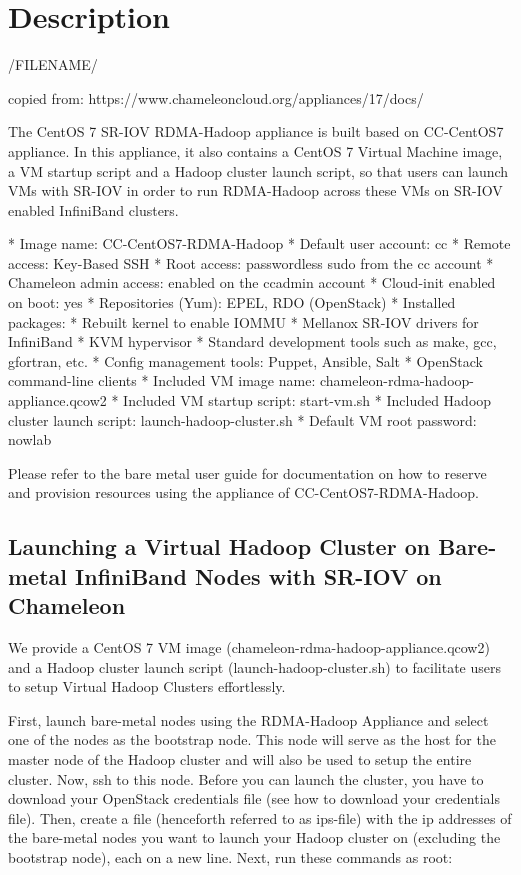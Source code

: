 \section{Description}

/FILENAME/

copied from: https://www.chameleoncloud.org/appliances/17/docs/

The CentOS 7 SR-IOV RDMA-Hadoop appliance is built based on CC-CentOS7
appliance. In this appliance, it also contains a CentOS 7 Virtual
Machine image, a VM startup script and a Hadoop cluster launch script,
so that users can launch VMs with SR-IOV in order to run RDMA-Hadoop
across these VMs on SR-IOV enabled InfiniBand clusters.

* Image name: CC-CentOS7-RDMA-Hadoop
* Default user account: cc
* Remote access: Key-Based SSH
* Root access: passwordless sudo from the cc account
* Chameleon admin access: enabled on the ccadmin account
* Cloud-init enabled on boot: yes
* Repositories (Yum): EPEL, RDO (OpenStack)
* Installed packages:
  * Rebuilt kernel to enable IOMMU
  * Mellanox SR-IOV drivers for InfiniBand
  * KVM hypervisor
  * Standard development tools such as make, gcc, gfortran, etc.
  * Config management tools: Puppet, Ansible, Salt
  * OpenStack command-line clients
* Included VM image name: chameleon-rdma-hadoop-appliance.qcow2
* Included VM startup script: start-vm.sh
* Included Hadoop cluster launch script: launch-hadoop-cluster.sh
* Default VM root password: nowlab


Please refer to the bare metal user guide for documentation on how to reserve and provision resources using the appliance of CC-CentOS7-RDMA-Hadoop.

\subsection{Launching a Virtual Hadoop Cluster on Bare-metal InfiniBand Nodes with SR-IOV on Chameleon}


We provide a CentOS 7 VM image (chameleon-rdma-hadoop-appliance.qcow2)
and a Hadoop cluster launch script (launch-hadoop-cluster.sh) to
facilitate users to setup Virtual Hadoop Clusters effortlessly.

First, launch bare-metal nodes using the RDMA-Hadoop Appliance and select one of the nodes as the bootstrap node. This node will serve as the host for the master node of the Hadoop cluster and will also be used to setup the entire cluster. Now, ssh to this node. Before you can launch the cluster, you have to download your OpenStack credentials file (see how to download your credentials file). Then, create a file (henceforth referred to as ips-file) with the ip addresses of the bare-metal nodes you want to launch your Hadoop cluster on (excluding the bootstrap node), each on a new line. Next, run these commands as root:

